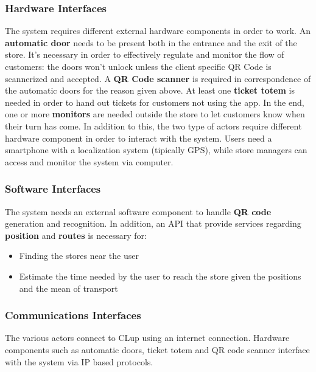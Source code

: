 \documentclass[]{article}
\begin{document}
		
			\subsubsection{Hardware Interfaces}
			The system requires different external hardware components in order to work. \newline
			An \textbf{automatic door} needs to be present both in the entrance and the exit of the store. It's necessary in order to effectively regulate and monitor the flow of customers: the doors won't unlock unless the client specific QR Code is scannerized and accepted. \newline
			A \textbf{QR Code scanner} is required in correspondence of the automatic doors for the reason given above. \newline
			At least one \textbf{ticket totem} is needed in order to hand out tickets for customers not using the app. \newline
			In the end, one or more \textbf{monitors} are needed outside the store to let customers know when their turn has come. \newline \newline
			In addition to this, the  two type of actors require different hardware component in order to interact with the system. \newline
			Users need a smartphone with a localization system (tipically GPS), while store managers can access and monitor the system via computer.
			\subsubsection{Software Interfaces}
			The system needs an external software component to handle \textbf{QR code} generation and recognition. \newline
			In addition, an API that provide services regarding \textbf{position} and \textbf{routes} is necessary for: 
			\begin{itemize}
				\item Finding the stores near the user
				\item Estimate the time needed by the user to reach the store given the positions and the mean of transport
			\end{itemize}
			\subsubsection{Communications Interfaces}
			The various actors connect to CLup using an internet connection. \newline
			Hardware components such as automatic doors, ticket totem and QR code scanner interface with the system via IP based protocols.
		
\end{document}
